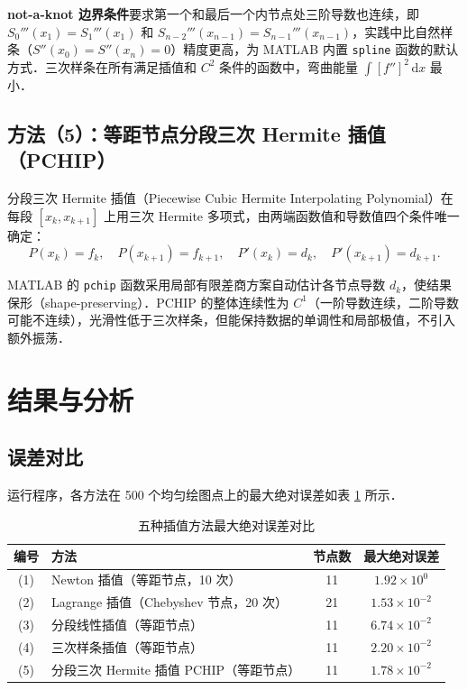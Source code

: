 \documentclass[UTF8,a4paper,11pt]{article}
\begin{document}
\textbf{not-a-knot 边界条件}要求第一个和最后一个内节点处三阶导数也连续，即 $S_0'''(x_1)=S_1'''(x_1)$ 和 $S_{n-2}'''(x_{n-1})=S_{n-1}'''(x_{n-1})$，实践中比自然样条（$S''(x_0)=S''(x_n)=0$）精度更高，为 MATLAB 内置 \texttt{spline} 函数的默认方式．三次样条在所有满足插值和 $C^2$ 条件的函数中，弯曲能量 $\int [f'']^2\,\mathrm{d}x$ 最小．

\subsection{方法（5）：等距节点分段三次 Hermite 插值（PCHIP）}

分段三次 Hermite 插值（Piecewise Cubic Hermite Interpolating Polynomial）在每段 $[x_k,x_{k+1}]$ 上用三次 Hermite 多项式，由两端函数值和导数值四个条件唯一确定：
$$P(x_k) = f_k,\quad P(x_{k+1}) = f_{k+1},\quad P'(x_k) = d_k,\quad P'(x_{k+1}) = d_{k+1}.$$

MATLAB 的 \texttt{pchip} 函数采用局部有限差商方案自动估计各节点导数 $d_k$，使结果保形（shape-preserving）．PCHIP 的整体连续性为 $C^1$（一阶导数连续，二阶导数可能不连续），光滑性低于三次样条，但能保持数据的单调性和局部极值，不引入额外振荡．

\section{结果与分析}

\subsection{误差对比}

运行程序，各方法在 500 个均匀绘图点上的最大绝对误差如表 \ref{tab:errors} 所示．

\begin{table}[H]
\centering
\caption{五种插值方法最大绝对误差对比}
\label{tab:errors}
\begin{tabular}{clcc}
\toprule
编号 & 方法 & 节点数 & 最大绝对误差 \\
\midrule
(1) & Newton 插值（等距节点，10 次）         & 11 & $1.92\times10^{0}$ \\
(2) & Lagrange 插值（Chebyshev 节点，20 次） & 21 & $1.53\times10^{-2}$ \\
(3) & 分段线性插值（等距节点）               & 11 & $6.74\times10^{-2}$ \\
(4) & 三次样条插值（等距节点）               & 11 & $2.20\times10^{-2}$ \\
(5) & 分段三次 Hermite 插值 PCHIP（等距节点） & 11 & $1.78\times10^{-2}$ \\
\bottomrule
\end{tabular}
\end{table}
\end{document}
